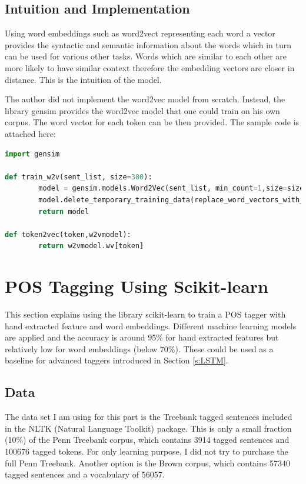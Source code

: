 \documentclass[11pt]{article}
\theoremstyle{plain}
\begin{document}
\subsection{Intuition and Implementation}

Using word embeddings such as word2vect representing each word a vector 
provides the syntactic and semantic information about the words which in 
turn can be used for various other tasks. Words which are similar to each 
other are more likely to have similar context therefore the embedding vectors 
are closer in distance. This is the intuition of the model. 

The author did not implement the word2vec model from scratch. Instead, the 
library gensim provides the word2vec model that one could train on his own 
corpus. The word vector for each token can be then provided. The sample 
code is attached here:

 \begin{lstlisting}[language=Python]
import gensim

def train_w2v(sent_list, size=300):
		model = gensim.models.Word2Vec(sent_list, min_count=1,size=size)
		model.delete_temporary_training_data(replace_word_vectors_with_normalized=True)
		return model

def token2vec(token,w2vmodel):
		return w2vmodel.wv[token]
\end{lstlisting}


\section{POS Tagging Using Scikit-learn}
\label{s:pos-sklearn}

This section explains using the library scikit-learn to train a POS tagger with 
hand extracted feature and word embeddings. Different machine learning 
models are applied and the accuracy is around 95\% for hand extracted 
features but relatively low for word embeddings (below 70\%). These could 
be used as a baseline for advanced taggers introduced in Section 
\ref{s:LSTM}. 

\subsection{Data}

The data set I am using for this part is the Treebank tagged sentences 
included in the NLTK (Natural Language Toolkit) package. This is only a small 
fraction (10\%) of the Penn Treebank corpus, which contains 3914 tagged 
sentences and 100676 tagged tokens. For only learning purpose, I did not try 
to purchase the full Penn Treebank. Another option is the Brown corpus, 
which contains 57340 tagged sentences and a vocabulary of 56057. 
\end{document}
